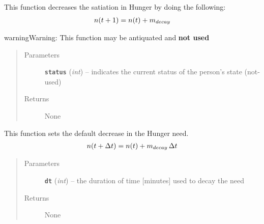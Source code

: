 \documentclass[letterpaper,10pt,english]{sphinxmanual}
\begin{document}
\begin{fulllineitems}
\begin{quote}
\begin{description}
\begin{itemize}
\end{itemize}

\end{description}\end{quote}

\begin{fulllineitems}
\label{hunger:hunger.Hunger.decay}
This function decreases the satiation in Hunger by doing the following:
\begin{gather}
\begin{split}n(t + 1) = n(t) + m_{decay}                        \end{split}\notag
\end{gather}
\begin{notice}{warning}{Warning:}
This function may be antiquated and \textbf{not used}
\end{notice}
\begin{quote}\begin{description}
\item[{Parameters}] \leavevmode
\textbf{\texttt{status}} (\emph{int}) -- indicates the current status of the person's state (not-used)

\item[{Returns}] \leavevmode
None

\end{description}\end{quote}

\end{fulllineitems}


\begin{fulllineitems}
\label{hunger:hunger.Hunger.decay_new}
This function sets the default decrease in the Hunger need.
\begin{gather}
\begin{split}n(t + \Delta{t}) = n(t) + m_{decay}\,\Delta{t}\end{split}\notag
\end{gather}\begin{quote}\begin{description}
\item[{Parameters}] \leavevmode
\textbf{\texttt{dt}} (\emph{int}) -- the duration of time {[}minutes{]} used to decay the need

\item[{Returns}] \leavevmode
None


\end{description}
\end{quote}
\end{fulllineitems}
\end{fulllineitems}
\end{document}
